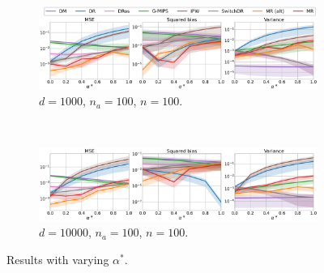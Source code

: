  \begin{figure}[ht]
     \centering
    \begin{subfigure}[b]{0.8\textwidth}
         \centering
         \includegraphics[width=\textwidth]{figures/mr/all_baselines/ope_vs_alphatar_dimc_1000_nac_100_neval_100_ntrain_10000.png}
         \caption{$d=1000$, $n_{a}=100$, $n = 100$.}
         \label{fig:mse-vs-betatar-conf2a}
     \end{subfigure}\\
     \begin{subfigure}[b]{0.8\textwidth}
         \centering
         \includegraphics[width=\textwidth]{figures/mr/all_baselines/ope_vs_alphatar_nac_100_neval_100_dimc_10000_ntrain_100000.png}
         \caption{$d=10000$, $n_{a}=100$, $n = 100$.}
         \label{fig:mse-vs-betatar-conf2b}
     \end{subfigure}
     \caption{Results with varying $\alpha^\ast$.}
     \label{fig:mse-vs-betatar-conf2}
 \end{figure}


